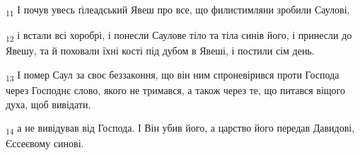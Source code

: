 \begin{tcolorbox}
\textsubscript{11} І почув увесь ґілеадський Явеш про все, що филистимляни зробили Саулові,
\end{tcolorbox}
\begin{tcolorbox}
\textsubscript{12} і встали всі хоробрі, і понесли Саулове тіло та тіла синів його, і принесли до Явешу, та й поховали їхні кості під дубом в Явеші, і постили сім день.
\end{tcolorbox}
\begin{tcolorbox}
\textsubscript{13} І помер Саул за своє беззаконня, що він ним спроневірився проти Господа через Господнє слово, якого не тримався, а також через те, що питався віщого духа, щоб вивідати,
\end{tcolorbox}
\begin{tcolorbox}
\textsubscript{14} а не вивідував від Господа. І Він убив його, а царство його передав Давидові, Єссеєвому синові.
\end{tcolorbox}
